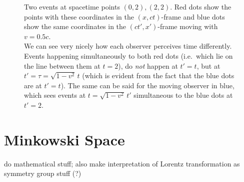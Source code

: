 \begin{figure}
\centering


\caption{Two events at spacetime points $(0,2), (2,2)$. Red dots show the points with these coordinates in the $(x, ct)$-frame and blue dots show the same coordinates in the $(ct', x')$-frame moving with $v = 0.5 c$.\\
We can see very nicely how each observer perceives time differently. Events happening simultaneously to both red dots (i.e.~which lie on the line between them at $t = 2$), do \emph{not} happen at $t' = t$, but at $t' = \tau = \sqrt{1 - v^2} \, t$ (which is evident from the fact that the blue dots are at $t' = t$). The same can be said for the moving observer in blue, which sees events at $t = \sqrt{1 - v^2} \, t'$ simultaneous to the blue dots at $t' = 2$.}
\end{figure}



\newpage



	\section{Minkowski Space}
do mathematical stuff; also make interpretation of Lorentz transformation as symmetry group stuff (?)


